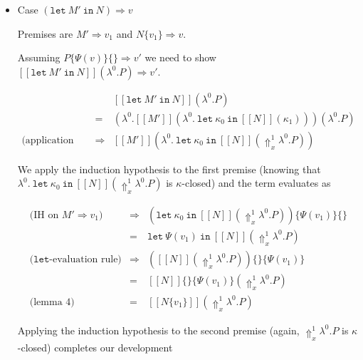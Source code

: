 \documentclass[a4paper,11pt]{article}
\begin{document}
\begin{itemize}
\begin{itemize}
\end{itemize}

\item{Case $(\texttt{let} \: M' \: \texttt{in} \: N) \Rightarrow v$}

Premises are $M' \Rightarrow v_{1}$ and $N\{v_{1}\} \Rightarrow v$.

Assuming $P\{\Psi(v)\}\{\} \Rightarrow v'$ we need to show
$[\![\texttt{let} \: M' \: \texttt{in} \: N]\!](\lambda^{0}.P) \Rightarrow v'$.

\begin{eqnarray*}
                                     &             & [\![\texttt{let} \: M' \: \texttt{in} \: N]\!](\lambda^{0}.P) \\
                                     & =           & (\lambda^{0}.[\![M']\!](\lambda^{0}. \: \texttt{let} \: \kappa_{0} \: \texttt{in} \: [\![N]\!](\kappa_{1})))(\lambda^{0}.P) \\
\mbox{(application evaluation rule)} & \Rightarrow & [\![M']\!](\lambda^{0}. \: \texttt{let} \: \kappa_{0} \: \texttt{in} \: [\![N]\!](\Uparrow_{x}^{1} \lambda^{0}.P))
\end{eqnarray*}

We apply the induction hypothesis to the first premise (knowing that $\lambda^{0}. \: \texttt{let} \: \kappa_{0} \: \texttt{in} \: [\![N]\!](\Uparrow_{x}^{1} \lambda^{0}.P)$
is $\kappa$-closed) and the term evaluates as

\begin{eqnarray*}
\mbox{(IH on $M' \Rightarrow v_{1}$)}    & \Rightarrow & (\texttt{let} \: \kappa_{0} \: \texttt{in} \: [\![N]\!](\Uparrow_{x}^{1} \lambda^{0}.P))\{\Psi(v_{1})\}\{\} \\
                                        & =           & \texttt{let} \: \Psi(v_{1}) \: \texttt{in} \: [\![N]\!](\Uparrow_{x}^{1} \lambda^{0}.P) \\
\mbox{($\texttt{let}$-evaluation rule)} & \Rightarrow & ([\![N]\!](\Uparrow_{x}^{1} \lambda^{0}.P))\{\}\{\Psi(v_{1})\} \\
                                        & =           & [\![N]\!]\{\}\{\Psi(v_{1})\}(\Uparrow_{x}^{1} \lambda^{0}.P) \\
\mbox{(lemma 4)}                        & =           & [\![N\{v_{1}\}]\!](\Uparrow_{x}^{1} \lambda^{0}.P)
\end{eqnarray*}

Applying the induction hypothesis to the second premise (again, $\Uparrow_{x}^{1} \lambda^{0}.P$ is $\kappa$-closed)
completes our development


\end{itemize}
\end{document}
